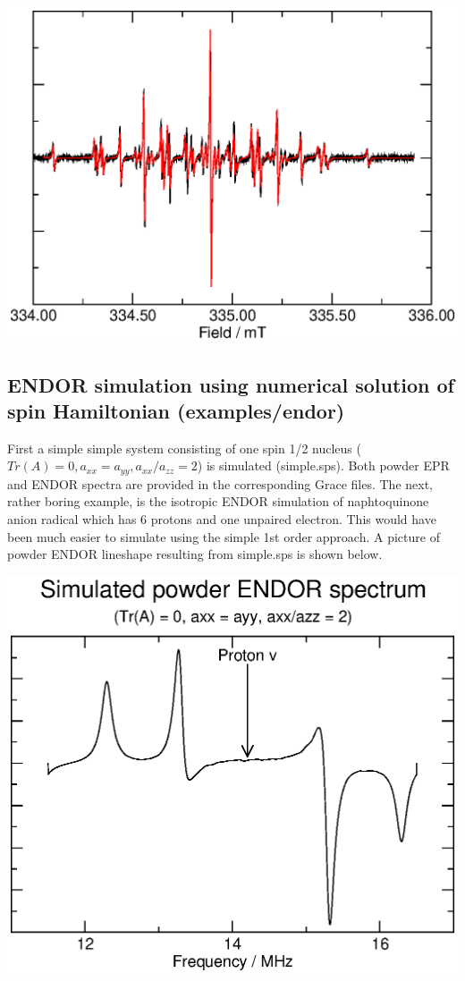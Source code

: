\documentclass[byrevtex,amssymb,aps,pra,floatfix,letterpaper]{revtex4}
\begin{document}
\begin{center}
\includegraphics*[scale=0.4]{fig8}
\end{center}

\subsection{ENDOR simulation using numerical solution of spin Hamiltonian (examples/endor)}

First a simple simple system consisting of one spin 1/2 nucleus ($Tr(A) = 0, a_{xx} = a_{yy}, a_{xx}/a_{zz} = 2$) is simulated (simple.sps). Both powder EPR and ENDOR spectra are provided in the corresponding Grace files. The next, rather boring example, is the isotropic ENDOR simulation of naphtoquinone anion radical which has 6 protons and one unpaired electron. This would have been much easier to simulate using the simple 1st order approach. A picture of powder ENDOR lineshape resulting from simple.sps is shown below.

\begin{center}
\includegraphics*[scale=0.4]{fig9}
\end{center}
\end{document}
